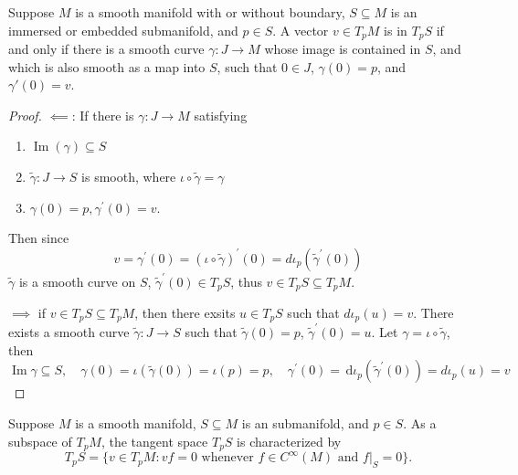 \documentclass[../main.tex]{subfiles}
\begin{document}
\begin{proposition}{}{}
Suppose $M$ is a smooth manifold with or without boundary, $S \subseteq M$ is an immersed or embedded submanifold, and $p \in S$. A vector $v \in T_{p}M$ is in $T_{p}S$ if and only if there is a smooth curve $\gamma : J \to M$ whose image is contained in $S$, and which is also smooth as a map into $S$, such that $0 \in J$, $\gamma(0) = p$, and $\gamma'(0) = v$.
\end{proposition}
\begin{proof}
   \(  \impliedby   \): If there is \(   \gamma :J\to M  \) satisfying 
   \begin{enumerate}
    \item \(  \operatorname{Im}\left(  \gamma  \right)\subseteq S   \) 
     \item \(   \tilde{\gamma} :J\to S  \) is smooth, where \(  \iota \circ  \tilde{\gamma} =  \gamma   \) 
     \item \(   \gamma \left( 0 \right)= p,  \gamma ^{\prime} \left( 0 \right)= v    \). 
   \end{enumerate}
     Then since \[
     v=  \gamma ^{\prime} \left( 0 \right)= \left( \iota \circ  \tilde{\gamma}  \right)^{\prime} \left( 0 \right)=  d \iota _{p}\left(   \tilde{\gamma}  ^{\prime} \left( 0 \right)  \right)    
     \]\(   \tilde{\gamma}   \) is a smooth curve on \(  S  \), \(   \tilde{\gamma} ^{\prime} \left( 0 \right)\in T_{p}S   \), thus  \(  v  \in T_{p}S\subseteq T_{p}M\). 
     
     \(  \implies   \) if \(  v\in T_{p}S\subseteq T_{p}M  \), then there exsits \(  u\in T_{p}S  \) such that \(  d \iota _{p}\left( u \right)= v   \).    There exists a smooth curve \(   \tilde{\gamma} :J\to S  \) such that \(   \tilde{\gamma} \left( 0 \right)= p   \), \(   \tilde{\gamma} ^{\prime} \left( 0 \right)= u   \). Let \(   \gamma = \iota \circ  \tilde{\gamma}   \), then  \[
   \operatorname{Im} \gamma \subseteq S, \quad  \gamma \left( 0 \right)= \iota \left(  \tilde{\gamma} \left( 0 \right)  \right)= \iota \left( p \right)= p      ,\quad \gamma ^{\prime} \left( 0 \right)= \,\mathrm{d} \iota _{p}\left(  \tilde{\gamma} ^{\prime} \left( 0 \right)  \right)= d \iota _{p}\left( u \right)= v   
     \]    
\end{proof}

\begin{proposition}{}
Suppose $M$ is a smooth manifold, $S \subseteq M$ is an  submanifold, and $p \in S$. As a subspace of $T_{p}M$, the tangent space $T_{p}S$ is characterized by
\[
T_{p}S = \{ v \in T_{p}M : v f = 0 \text{ whenever } f \in C^{\infty}(M) \text{ and } f\big|_{S} = 0 \}.
\]
\end{proposition}
\end{document}
